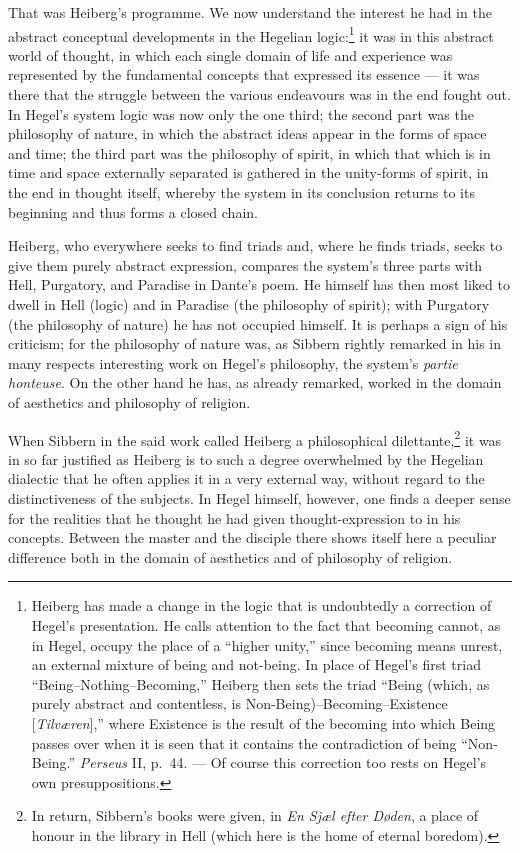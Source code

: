 \documentclass[12pt,a4paper]{book}
\newcommand{\opage}[1]{\marginnote{\footnotesize\textit{[#1]}}}
\begin{document}
That was Heiberg's programme. We now understand the interest he had in the abstract conceptual
developments in the Hegelian logic:\footnote{Heiberg has made a change in the logic that is
undoubtedly a correction of Hegel's presentation. He calls attention to the fact that becoming
cannot, as in Hegel, occupy the place of a ``higher unity,'' since becoming means unrest, an
external mixture of being and not-being. In place of Hegel's first triad ``Being--Nothing--Becoming,''
Heiberg then sets the triad ``Being (which, as purely abstract and contentless, is
Non-Being)--Becoming--Existence [\emph{Tilværen}],'' where Existence is the result of the
becoming into which Being passes over when it is seen that it contains the contradiction of
being ``Non-Being.'' \emph{Perseus} II, p.~44. --- Of course this correction too rests on
Hegel's own presuppositions.} it was in this abstract world of thought, in which \opage{132}each single
domain of life and experience was represented by the fundamental concepts that expressed its
essence --- it was there that the struggle between the various endeavours was in the end fought
out. In Hegel's system logic was now only the one third; the second part was the philosophy of
nature, in which the abstract ideas appear in the forms of space and time; the third part was
the philosophy of spirit, in which that which is in time and space externally separated is
gathered in the unity-forms of spirit, in the end in thought itself, whereby the system in its
conclusion returns to its beginning and thus forms a closed chain.

Heiberg, who everywhere seeks to find triads and, where he finds triads, seeks to give them
purely abstract expression, compares the system's three parts with Hell, Purgatory, and
Paradise in Dante's poem. He himself has then most liked to dwell in Hell (logic) and in
Paradise (the philosophy of spirit); with Purgatory (the philosophy of nature) he has not
occupied himself. It is perhaps a sign of his criticism; for the philosophy of nature was, as
Sibbern rightly remarked in his in many respects interesting work on Hegel's philosophy, the
system's \emph{partie honteuse}. On the other hand he has, as already remarked, worked in the
domain of aesthetics and philosophy of religion.

When Sibbern in the said work called Heiberg a philosophical dilettante,\footnote{In return,
Sibbern's books were given, in \emph{En Sjæl efter Døden}, a place of honour in the library in
Hell (which here is the home of eternal boredom).} it was in so far justified as Heiberg is to
such a degree overwhelmed by the Hegelian dialectic that he often applies it in a very external
way, without regard to the distinctiveness of the subjects. In Hegel himself, however, one
finds a deeper sense for the realities that he thought he had given thought-expression to in
his concepts. Between the master and \opage{133}the disciple there shows itself here a peculiar difference
both in the domain of aesthetics and of philosophy of religion.
\end{document}
